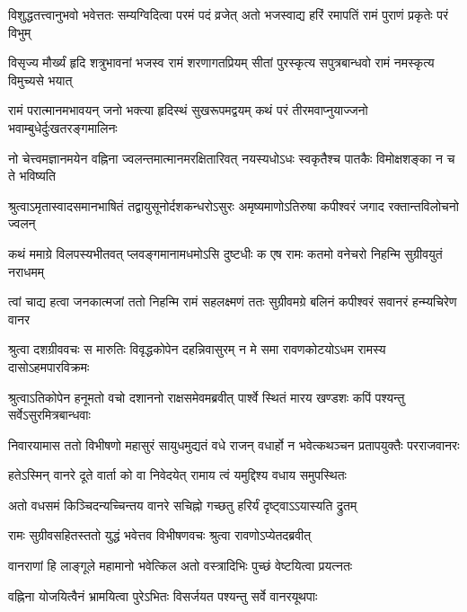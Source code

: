 \fourlineindentedshloka
{विशुद्धतत्त्वानुभवो भवेत्ततः}
{सम्यग्विदित्वा परमं पदं व्रजेत्} %
{अतो भजस्वाद्य हरिं रमापतिं}
{रामं पुराणं प्रकृतेः परं विभुम्}

\fourlineindentedshloka
{विसृज्य मौर्ख्यं हृदि शत्रुभावनां}
{भजस्व रामं शरणागतप्रियम्}
{सीतां पुरस्कृत्य सपुत्रबान्धवो}
{रामं नमस्कृत्य विमुच्यसे भयात्} %

\fourlineindentedshloka
{रामं परात्मानमभावयन् जनो}
{भक्त्या हृदिस्थं सुखरूपमद्वयम्}
{कथं परं तीरमवाप्नुयाज्जनो}
{भवाम्बुधेर्दुःखतरङ्गमालिनः} %

\fourlineindentedshloka
{नो चेत्त्वमज्ञानमयेन वह्निना}
{ज्वलन्तमात्मानमरक्षितारिवत्}
{नयस्यधोऽधः स्वकृतैश्च पातकैः}
{विमोक्षशङ्का न च ते भविष्यति} %

\fourlineindentedshloka
{श्रुत्वाऽमृतास्वादसमानभाषितं}
{तद्वायुसूनोर्दशकन्धरोऽसुरः}
{अमृष्यमाणोऽतिरुषा कपीश्वरं}
{जगाद रक्तान्तविलोचनो ज्वलन्} %

\fourlineindentedshloka
{कथं ममाग्रे विलपस्यभीतवत्}
{प्लवङ्गमानामधमोऽसि दुष्टधीः}
{क एष रामः कतमो वनेचरो}
{निहन्मि सुग्रीवयुतं नराधमम्} %

\fourlineindentedshloka
{त्वां चाद्य हत्वा जनकात्मजां ततो}
{निहन्मि रामं सहलक्ष्मणं ततः}
{सुग्रीवमग्रे बलिनं कपीश्वरं}
{सवानरं हन्म्यचिरेण वानर}


\fourlineindentedshloka
{श्रुत्वा दशग्रीववचः स मारुतिः}
{विवृद्धकोपेन दहन्निवासुरम्} %
{न मे समा रावणकोटयोऽधम}
{रामस्य दासोऽहमपारविक्रमः}

\fourlineindentedshloka
{श्रुत्वाऽतिकोपेन हनूमतो वचो}
{दशाननो राक्षसमेवमब्रवीत्} %
{पार्श्वे स्थितं मारय खण्डशः कपिं}
{पश्यन्तु सर्वेऽसुरमित्रबान्धवाः}

\fourlineindentedshloka
{निवारयामास ततो विभीषणो}
{महासुरं सायुधमुद्यतं वधे}
{राजन् वधार्हो न भवेत्कथञ्चन}
{प्रतापयुक्तैः परराजवानरः} %

\twolineshloka
{हतेऽस्मिन् वानरे दूते वार्ता को वा निवेदयेत्}
{रामाय त्वं यमुद्दिश्य वधाय समुपस्थितः} %

\twolineshloka
{अतो वधसमं किञ्चिदन्यच्चिन्तय वानरे}
{सचिह्नो गच्छतु हरिर्यं दृष्ट्वाऽऽयास्यति द्रुतम्} %

\twolineshloka
{रामः सुग्रीवसहितस्ततो युद्धं भवेत्तव}
{विभीषणवचः श्रुत्वा रावणोऽप्येतदब्रवीत्} %

\twolineshloka
{वानराणां हि लाङ्गूले महामानो भवेत्किल}
{अतो वस्त्रादिभिः पुच्छं वेष्टयित्वा प्रयत्नतः} %

\twolineshloka
{वह्निना योजयित्वैनं भ्रामयित्वा पुरेऽभितः}
{विसर्जयत पश्यन्तु सर्वे वानरयूथपाः} %

